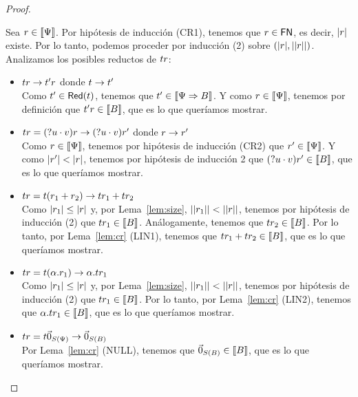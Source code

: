 \begin{proof}
\begin{itemize}
        Sea \( r \in \llbracket\Psi\rrbracket \). Por hipótesis de inducción (CR1), tenemos que \( r \in \mathsf{FN} \), es decir, \( |r| \) existe. Por lo tanto, podemos proceder por inducción (2) sobre \( (|r|, ||r||) \).
        Analizamos los posibles reductos de \( t r \):
        \begin{itemize}
          \item \( t r \rightarrow t' r \) donde \( t \rightarrow t' \)
            \\ Como \( t' \in \mathsf{Red} (t) \), tenemos que \( t' \in \llbracket\Psi \Rightarrow B\rrbracket \). Y como \( r \in \llbracket\Psi\rrbracket \), tenemos por definición que \( t' r \in \llbracket B\rrbracket \), que es lo que queríamos mostrar.
          \item \( t r = (? u \cdot v) r \rightarrow (? u \cdot v) r' \) donde \( r \rightarrow r' \)
            \\ Como \( r \in \llbracket\Psi\rrbracket \), tenemos por hipótesis de inducción (CR2) que \( r' \in \llbracket\Psi\rrbracket \). Y como \( |r'| < |r| \), tenemos por hipótesis de inducción 2 que \( (? u \cdot v) r' \in \llbracket B\rrbracket \), que es lo que queríamos mostrar.
          \item \( t r = t (r_1 + r_2) \rightarrow t r_1 + t r_2 \)
            \\ Como \( |r_1| \leq |r| \) y, por Lema~\ref{lem:size}, \( ||r_1|| < ||r|| \), tenemos por hipótesis de inducción (2) que \( t r_1 \in \llbracket B\rrbracket \). Análogamente, tenemos que \( t r_2 \in \llbracket B\rrbracket \). Por lo tanto, por Lema~\ref{lem:cr} (LIN1), tenemos que \( t r_1 + t r_2 \in \llbracket B\rrbracket \), que es lo que queríamos mostrar.
          \item \( t r = t (\alpha . r_1) \rightarrow \alpha . t r_1 \)
            \\ Como \( |r_1| \leq |r| \) y, por Lema~\ref{lem:size}, \( ||r_1|| < ||r|| \), tenemos por hipótesis de inducción (2) que \( t r_1 \in \llbracket B\rrbracket \). Por lo tanto, por Lema~\ref{lem:cr} (LIN2), tenemos que \( \alpha . t r_1 \in \llbracket B\rrbracket \), que es lo que queríamos mostrar.
          \item \( t r = t \vec{0}_{S (\Psi)} \rightarrow \vec{0}_{S (B)} \)
            \\ Por Lema~\ref{lem:cr} (NULL), tenemos que \( \vec{0}_{S (B)} \in \llbracket B\rrbracket \), que es lo que queríamos mostrar.
        \end{itemize}

\end{itemize}
\end{proof}
